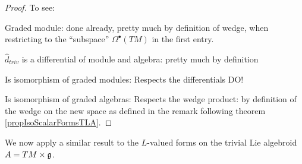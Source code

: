 \begin{proof}
To see:

Graded module: done already, pretty much by definition of wedge, when restricting to the ``subspace'' $\Omega^\bullet(TM)$ in the first entry.

$\hat d_{triv}$ is a differential of module and algebra: pretty much by definition

Is isomorphism of graded modules: Respects the differentials DO!

Is isomorphism of graded algebras: Respects the wedge product: by definition of the wedge on the new space as defined in the remark following theorem \ref{propIsoScalarFormsTLA}.
\end{proof}


\linea

We now apply a similar result to the $L$-valued forms on the trivial Lie algebroid $A = TM \times \mathfrak{g}$.

